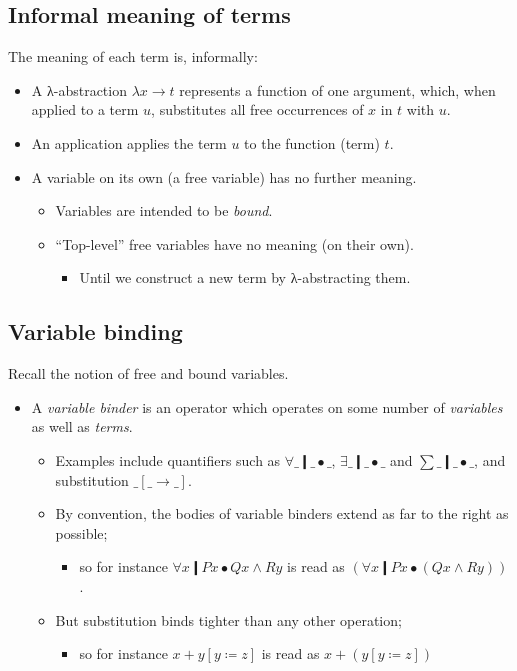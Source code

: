 \documentclass[11pt]{article}
\theoremstyle{definition}
\begin{document}
\subsection{Informal meaning of terms}
\label{sec:orgb6a7c86}
The meaning of each term is, informally:
\begin{itemize}
\item A λ-abstraction \(λ x → t\) represents a function of one argument,
which, when applied to a term \(u\), substitutes
all free occurrences of \(x\) in \(t\) with \(u\).
\item An application applies the term \(u\) to the function (term) \(t\).
\item A variable on its own (a free variable) has no further meaning.
\begin{itemize}
\item Variables are intended to be \emph{bound}.
\item “Top-level” free variables have no meaning (on their own).
\begin{itemize}
\item Until we construct a new term by λ-abstracting them.
\end{itemize}
\end{itemize}
\end{itemize}

\subsection{Variable binding}
\label{sec:orga002952}
Recall the notion of free and bound variables.
\begin{itemize}
\item A \emph{variable binder} is an operator which operates on
some number of \emph{variables} as well as \emph{terms}.
\begin{itemize}
\item Examples include quantifiers
such as \(∀\_❙\_•\_\), \(∃\_❙\_•\_\) and \(∑\_❙\_•\_\),
and substitution \(\_[\_→\_]\).
\item By convention, the bodies of variable binders extend as far
to the right as possible;
\begin{itemize}
\item so for instance \(∀ x ❙ P x • Q x ∧ R y\) is read
as \((∀ x ❙ P x • (Q x ∧ R y))\).
\end{itemize}
\item But substitution binds tighter than any other operation;
\begin{itemize}
\item so for instance \(x + y [y ≔ z]\) is read as \(x + (y [y ≔ z])\)
\end{itemize}
\end{itemize}
\end{itemize}
\end{document}
